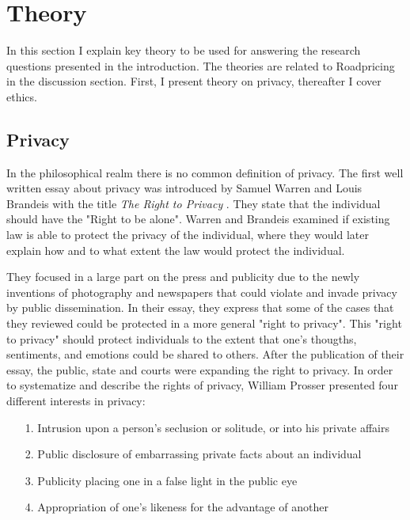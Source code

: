 \section{Theory}
In this section I explain key theory to be used for answering the research questions presented in the introduction. The theories are related to Roadpricing in the discussion section. First, I present theory on privacy, thereafter I cover ethics. 

\subsection{Privacy}
In the philosophical realm there is no common definition of privacy. 
The first well written essay about privacy was introduced by Samuel Warren and Louis Brandeis with the title \textit{The Right to Privacy} . They state that the individual should have the "Right to be alone". Warren and Brandeis examined if existing law is able to protect the privacy of the individual, where they would later explain how and to what extent the law would protect the individual. 

They focused in a large part on the press and publicity due to the newly inventions of photography and newspapers that could violate and invade privacy by public dissemination. In their essay, they express that some of the cases that they reviewed could be protected in a more general "right to privacy". This "right to privacy" should protect individuals to the extent that one's thougths, sentiments, and emotions could be shared to others. After the publication of their essay, the public, state and courts were expanding the right to privacy. In order to systematize and describe the rights of privacy, William Prosser presented four different interests in privacy:
\begin{itemize}
    \item[1.] Intrusion upon a person's seclusion or solitude, or into his private affairs
    \item[2.] Public disclosure of embarrassing private facts about an individual 
    \item[3.] Publicity placing one in a false light in the public eye
    \item[4.] Appropriation of one's likeness for the advantage of another \cite[p. 389]{prosser:1960} 
\end{itemize}


